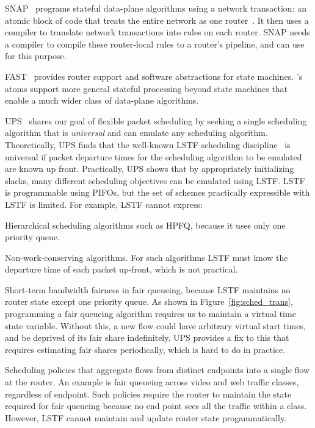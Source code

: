 SNAP~\cite{snap} programs stateful data-plane algorithms using a network
transaction: an atomic block of code that treats the entire network as one
router~\cite{onebigswitch}. It then uses a compiler to translate network
transactions into rules on each router. SNAP needs a compiler to compile these
router-local rules to a router's pipeline, and can use \pktlanguage for this
purpose.

FAST~\cite{fast} provides router support and software abstractions for
state machines. \absmachine's atoms support more general stateful processing
beyond state machines that enable a much wider class of data-plane algorithms.


 UPS~\cite{ups} shares our goal of
flexible packet scheduling by seeking a single scheduling algorithm that is
{\em universal} and can emulate any scheduling algorithm. Theoretically, UPS
finds that the well-known LSTF scheduling discipline~\cite{lstf} is universal
if packet departure times for the scheduling algorithm to be emulated are known
up front. Practically, UPS shows that by appropriately initializing slacks, many different scheduling objectives can be
emulated using LSTF. LSTF is programmable using PIFOs, but the set of schemes
practically expressible with LSTF is limited. For example, LSTF cannot
express:
\begin{CompactEnumerate}
\item Hierarchical scheduling algorithms such as HPFQ, because it
  uses only one priority queue.
\item Non-work-conserving algorithms. For such algorithms LSTF must know the
  departure time of each packet up-front, which is not practical.
\item Short-term bandwidth fairness in fair queueing, because LSTF maintains no
  router state except one priority queue. As shown in
  Figure~\ref{fig:sched_trans}, programming a fair queueing algorithm requires us
  to maintain a virtual time state variable. Without this, a new flow could have
  arbitrary virtual start times, and be deprived of its fair share indefinitely.
  UPS provides a fix to this that requires
  estimating fair shares periodically, which is hard to do in
  practice.
\item Scheduling policies that aggregate flows from distinct endpoints into a
  single flow at the router. An example is fair queueing across video and web
  traffic classes, regardless of endpoint.  Such policies require the router to
  maintain the state required for fair queueing because no end point sees all the
  traffic within a class.  However, LSTF cannot maintain and update router state
  progammatically.
\end{CompactEnumerate}
